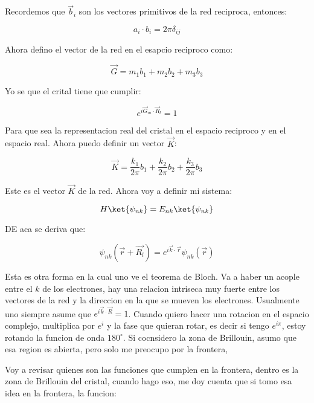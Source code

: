 \documentclass[11pt,fleqn]{book}
\begin{document}
Recordemos que $\vec{b}_{i}$ son los vectores primitivos de la red reciproca, entonces:

\begin{equation}
    a_{i}\cdot b_{i}=2\pi\delta_{ij}
\end{equation}

Ahora defino el vector de la red en el esapcio reciproco como:

\begin{equation}
    \vec{G}=m_{1}b_{1}+m_{2}b_{2}+m_{3}b_{3}
\end{equation}

Yo se que el crital tiene que cumplir:

\begin{equation}
    e^{i\vec{G}_{m}\cdot\vec{R}_{l}}=1
\end{equation}

Para que sea la representacion real del cristal en el espacio reciproco y en el espacio real. Ahora puedo definir un vector $\vec{K}$:

\begin{equation}
    \vec{K}=\frac{k_{1}}{2\pi}b_{1}+\frac{k_{2}}{2\pi}b_{2}+\frac{k_{3}}{2\pi}b_{3}
\end{equation}

Este es el vector $\vec{K}$ de la red. Ahora voy a definir mi sistema:

\begin{equation}
    H\ket{\psi_{nk}}=E_{nk}\ket{\psi_{nk}}
\end{equation}

DE aca se deriva que:

\begin{equation}
    \psi_{nk}(\vec{r}+\vec{R_{l}})=e^{i\vec{k}\cdot\vec{r}}\psi_{nk}(\vec{r})
\end{equation}

Esta es otra forma en la cual uno ve el teorema de Bloch. Va a haber un acople entre el $k$ de los electrones, hay una relacion intriseca muy fuerte entre los vectores de la red y la direccion en la que se mueven los electrones. Usualmente uno siempre asume que $e^{i\vec{k}\cdot\vec{R}}=1$. Cuando quiero hacer una rotacion en el espacio complejo, multiplica por $e^{i}$ y la fase que quieran rotar, es decir si tengo $e^{i\pi}$, estoy rotando la funcion de onda $180^{\circ}$. Si cocnsidero la zona de Brillouin, asumo que esa region es abierta, pero solo me preocupo por la frontera, 


Voy a revisar quienes son las funciones que cumplen en la frontera, dentro es la zona de Brillouin del cristal, cuando hago eso, me doy cuenta que si tomo esa idea en la frontera, la funcion:
\end{document}
